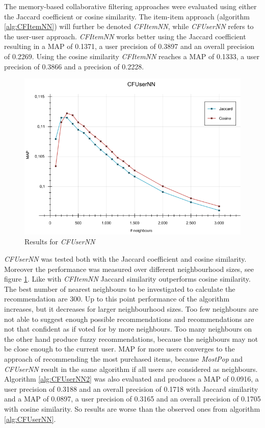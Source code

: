 \documentclass[10pt]{reportMaster}
\begin{document}
The memory-based collaborative filtering approaches were evaluated using either the Jaccard coefficient or cosine similarity.
The item-item approach (algorithm \ref{alg:CFItemNN}) will further be denoted \textit{CFItemNN}, while \textit{CFUserNN} refers to the user-user approach.
\textit{CFItemNN} works better using the Jaccard coefficient resulting in a MAP of 0.1371, a user precision of 0.3897 and an overall precision of 0.2269.
Using the cosine similarity \textit{CFItemNN} reaches a MAP of 0.1333, a user precision of 0.3866 and a precision of 0.2228.

\begin{figure}
	\centering
	\includegraphics[width=1\textwidth]{figures/experiments/CFUserNN}
	\caption{Results for \textit{CFUserNN}}
	\label{fig:CFUserNN}
\end{figure}

\textit{CFUserNN} was tested both with the Jaccard coefficient and cosine similarity.
Moreover the performance was measured over different neighbourhood sizes, see figure \ref{fig:CFUserNN}.
Like with \textit{CFItemNN} Jaccard similarity outperforms cosine similarity.
The best number of nearest neighbours to be investigated to calculate the recommendation are 300.
Up to this point performance of the algorithm increases, but it decreases for larger neighbourhood sizes.
Too few neighbours are not able to suggest enough possible recommendations and recommendations are not that confident as if voted for by more neighbours.
Too many neighbours on the other hand produce fuzzy recommendations, because the neighbours may not be close enough to the current user.
MAP for more users converges to the approach of recommending the most purchased items, because \textit{MostPop} and \textit{CFUserNN} result in the same algorithm if all users are considered as neighbours.
Algorithm \ref{alg:CFUserNN2} was also evaluated and produces a MAP of 0.0916, a user precision of 0.3188 and an overall precision of 0.1718 with Jaccard similarity and a MAP of 0.0897, a user precision of 0.3165 and an overall precision of 0.1705 with cosine similarity.
So results are worse than the observed ones from algorithm \ref{alg:CFUserNN}.
\end{document}
